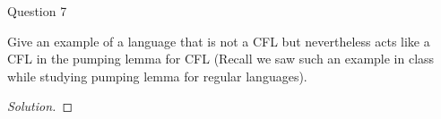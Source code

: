 \begin{solution}{Question 7}\label{ques:7}
    \begin{question}
     Give an example of a language that is not a CFL but nevertheless acts like a CFL in the pumping lemma for CFL (Recall we saw such an example in class while studying pumping lemma for regular languages). 
    \end{question}
    \tcblower{}
    \begin{proof}[Solution]
    \end{proof}
\end{solution}
